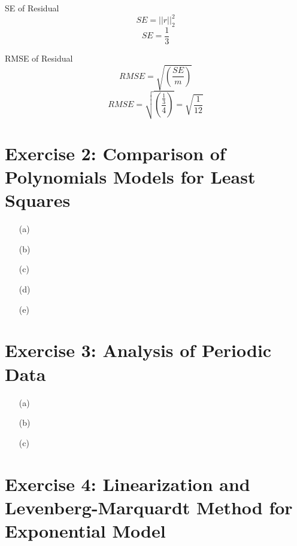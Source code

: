 \documentclass[unicode,11pt,a4paper,oneside,numbers=endperiod,openany]{scrartcl}
\begin{document}
\begin{itemize}
    
    {SE of Residual}\\
    \begin{equation}
	    SE = ||r||_2^2
	 \end{equation}
	 \begin{equation}
	    SE = \frac{1}{3}
	 \end{equation}
    
    {RMSE of Residual}\\
    \begin{equation}
	    RMSE = \sqrt{(\frac{SE}{m})}
	 \end{equation}
	 \begin{equation}
	    RMSE = \sqrt{(\frac{\frac{1}{3}}{4})} = \sqrt{\frac{1}{12}}
	 \end{equation}
\end{itemize}


\section*{Exercise 2: Comparison of Polynomials Models for Least Squares}

\begin{itemize}
	\item [(a)] 
	\item [(b)] 
	\item [(c)] 
	\item [(d)] 
	\item [(e)]
\end{itemize}


\section*{Exercise 3: Analysis of Periodic Data}

\begin{itemize}
	\item [(a)] 
	\item [(b)] 
	\item [(c)]
\end{itemize}


\section*{Exercise 4: Linearization and Levenberg-Marquardt Method for Exponential Model}
\end{document}
